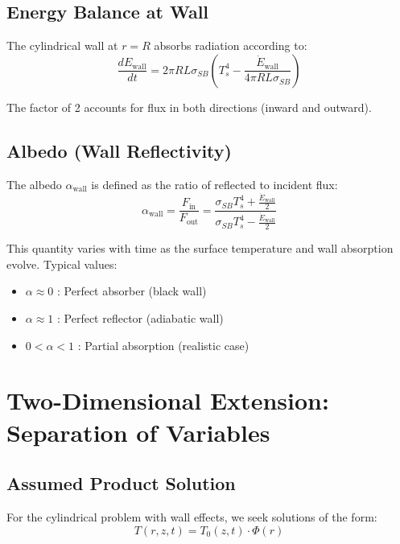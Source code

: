 \documentclass[12pt,a4paper]{article}
\begin{document}
\subsection{Energy Balance at Wall}

The cylindrical wall at $r=R$ absorbs radiation according to:
\begin{equation}
\frac{dE_{\text{wall}}}{dt} = 2\pi R L \sigma_{SB} \left(T_s^4 - \frac{\dot{E}_{\text{wall}}}{4\pi R L \sigma_{SB}}\right)
\end{equation}

The factor of 2 accounts for flux in both directions (inward and outward).

\subsection{Albedo (Wall Reflectivity)}

The albedo $\alpha_{\text{wall}}$ is defined as the ratio of reflected to incident flux:
\begin{equation}
\alpha_{\text{wall}} = \frac{F_{\text{in}}}{F_{\text{out}}} = \frac{\sigma_{SB}T_s^4 + \frac{\dot{E}_{\text{wall}}}{2}}{\sigma_{SB}T_s^4 - \frac{\dot{E}_{\text{wall}}}{2}}
\end{equation}

This quantity varies with time as the surface temperature and wall absorption evolve. Typical values:
\begin{itemize}
    \item $\alpha \approx 0$ : Perfect absorber (black wall)
    \item $\alpha \approx 1$ : Perfect reflector (adiabatic wall)
    \item $0 < \alpha < 1$ : Partial absorption (realistic case)
\end{itemize}

\section{Two-Dimensional Extension: Separation of Variables}

\subsection{Assumed Product Solution}

For the cylindrical problem with wall effects, we seek solutions of the form:
\begin{equation}
T(r,z,t) = T_0(z,t) \cdot \Phi(r)
\end{equation}
\end{document}
